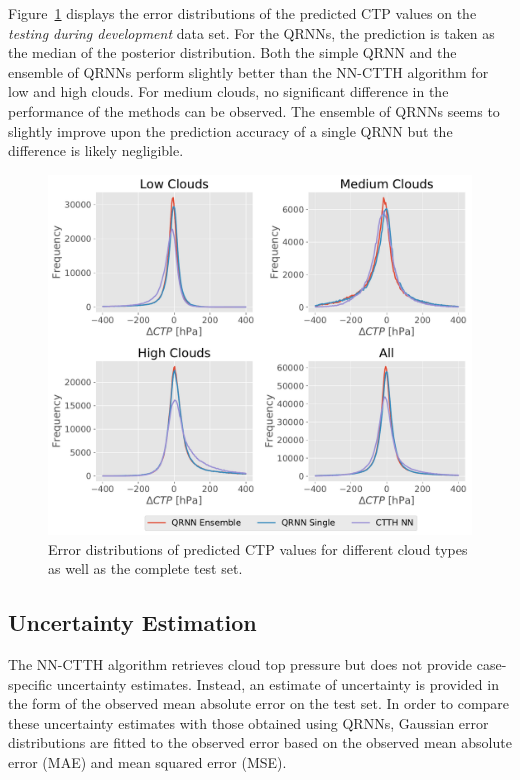 \documentclass[journal abbreviation, manuscript]{copernicus}
\begin{document}
Figure~\ref{fig:ctp_results} displays the error distributions of the predicted
CTP values on the \textit{testing during development} data set. For the QRNNs,
the prediction is taken as the median of the posterior distribution. Both the
simple QRNN and the ensemble of QRNNs perform slightly better than the NN-CTTH 
algorithm for low and high clouds. For medium clouds, no significant difference
in the performance of the methods can be observed. The ensemble of QRNNs seems
to slightly improve upon the prediction accuracy of a single QRNN but the
difference is likely negligible.

\begin{figure}[hbpt!]
  \centering
  \includegraphics[width = 1.0\linewidth]{../plots/ctp_results}
  \caption{Error distributions of predicted CTP values for different cloud
    types as well as the complete test set.}
  \label{fig:ctp_results}
\end{figure}

\subsection{Uncertainty Estimation}

The NN-CTTH algorithm retrieves cloud top pressure but does not provide
case-specific uncertainty estimates. Instead, an estimate of uncertainty is
provided in the form of the observed mean absolute error on the test set. In
order to compare these uncertainty estimates with those obtained using QRNNs,
Gaussian error distributions are fitted to the observed error based on the
observed mean absolute error (MAE) and mean squared error (MSE).
\end{document}
